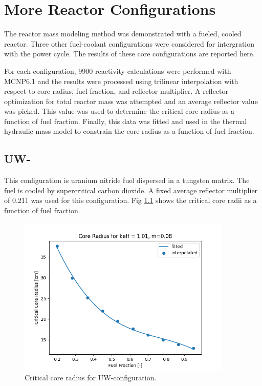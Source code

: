 \chapter{More Reactor Configurations}\label{ch:appendix-a}

The reactor mass modeling method was demonstrated with a \uox fueled, \codiox
cooled reactor. Three other fuel-coolant configurations were considered for
intergration with the power cycle. The results of these core configurations are
reported here.

For each configuration, 9900 reactivity calculations were performed with
MCNP6.1 and the \keff results were processed using trilinear interpolation with
respect to core radius, fuel fraction, and reflector multiplier. A reflector
optimization for total reactor mass was attempted and an average reflector value
was picked. This value was used to determine the critical core radius as a
function of fuel fraction. Finally, this data was fitted and used in the thermal
hydraulic mass model to constrain the core radius as a function of fuel
fraction.

\section{UW-\codiox}
This configuration is uranium nitride fuel dispersed in a tungsten matrix. The
fuel is cooled by supercritical carbon dioxide. A fixed average reflector
multiplier of 0.211 was used for this configuration. Fig \ref{fig:core_r_un_co2}
shows the critical core radii as a function of fuel fraction.

\begin{figure}[h]
    \centering
    \includegraphics[width=4in]{../images/core_r_un_co2.png}
\caption{Critical core radius for UW-\codiox configuration.}
\label{fig:core_r_un_co2}
\end{figure}


